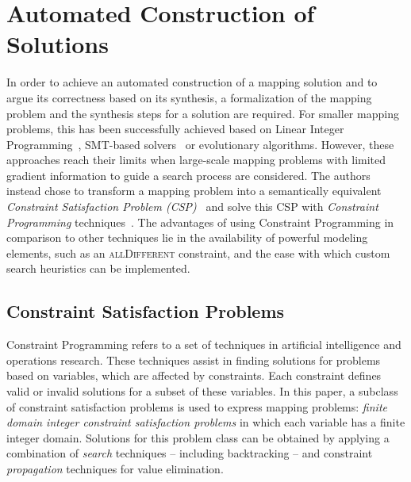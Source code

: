\documentclass[english,biblatex]{lni}
\begin{document}
\section{Automated Construction of Solutions}

In order to achieve an automated construction of a mapping solution and to argue its correctness based on its synthesis, a formalization of the mapping problem and the synthesis steps for a solution are required.
For smaller mapping problems, this has been successfully achieved based on Linear Integer Programming~\cite{Damm2006, Kugele2009}, SMT-based solvers~\cite{Voss2013} or evolutionary algorithms\cite{White2011}.
However, these approaches reach their limits when large-scale mapping problems with limited gradient information to guide a search process are considered.
The authors instead chose to transform a mapping problem into a semantically equivalent \emph{Constraint Satisfaction Problem (CSP)}~\cite{Apt2003,Dechter2003} and solve this CSP with \emph{Constraint Programming} techniques~\cite{Rossi2006,Prudhomme2016}.
The advantages of using Constraint Programming in comparison to other techniques lie in the availability of powerful modeling elements, such as an \textsc{allDifferent} constraint, and the ease with which custom search heuristics can be implemented.

\subsection{Constraint Satisfaction Problems}
Constraint Programming refers to a set of techniques in artificial intelligence and operations research.
These techniques assist in finding solutions for problems based on variables, which are affected by constraints.
Each constraint defines valid or invalid solutions for a subset of these variables.
In this paper, a subclass of constraint satisfaction problems is used to express mapping problems:  \emph{finite domain integer constraint satisfaction problems} in which each variable has a finite integer domain.
Solutions for this problem class can be obtained by applying a combination of \emph{search} techniques -- including backtracking -- and constraint \emph{propagation} techniques for value elimination.
\end{document}
